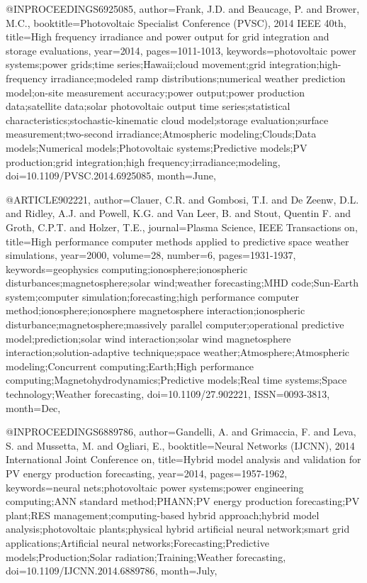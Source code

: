 @INPROCEEDINGS{6925085, 
author={Frank, J.D. and Beaucage, P. and Brower, M.C.}, 
booktitle={Photovoltaic Specialist Conference (PVSC), 2014 IEEE 40th}, 
title={High frequency irradiance and power output for grid integration and storage evaluations}, 
year={2014}, 
pages={1011-1013}, 
keywords={photovoltaic power systems;power grids;time series;Hawaii;cloud movement;grid integration;high-frequency irradiance;modeled ramp distributions;numerical weather prediction model;on-site measurement accuracy;power output;power production data;satellite data;solar photovoltaic output time series;statistical characteristics;stochastic-kinematic cloud model;storage evaluation;surface measurement;two-second irradiance;Atmospheric modeling;Clouds;Data models;Numerical models;Photovoltaic systems;Predictive models;PV production;grid integration;high frequency;irradiance;modeling},
doi={10.1109/PVSC.2014.6925085}, 
month={June},}

@ARTICLE{902221, 
author={Clauer, C.R. and Gombosi, T.I. and De Zeenw, D.L. and Ridley, A.J. and Powell, K.G. and Van Leer, B. and Stout, Quentin F. and Groth, C.P.T. and Holzer, T.E.}, 
journal={Plasma Science, IEEE Transactions on}, 
title={High performance computer methods applied to predictive space weather simulations}, 
year={2000}, 
volume={28}, 
number={6}, 
pages={1931-1937}, 
keywords={geophysics computing;ionosphere;ionospheric disturbances;magnetosphere;solar wind;weather forecasting;MHD code;Sun-Earth system;computer simulation;forecasting;high performance computer method;ionosphere;ionosphere magnetosphere interaction;ionospheric disturbance;magnetosphere;massively parallel computer;operational predictive model;prediction;solar wind interaction;solar wind magnetosphere interaction;solution-adaptive technique;space weather;Atmosphere;Atmospheric modeling;Concurrent computing;Earth;High performance computing;Magnetohydrodynamics;Predictive models;Real time systems;Space technology;Weather forecasting}, 
doi={10.1109/27.902221}, 
ISSN={0093-3813}, 
month={Dec},}

@INPROCEEDINGS{6889786, 
author={Gandelli, A. and Grimaccia, F. and Leva, S. and Mussetta, M. and Ogliari, E.}, 
booktitle={Neural Networks (IJCNN), 2014 International Joint Conference on}, 
title={Hybrid model analysis and validation for PV energy production forecasting}, 
year={2014}, 
pages={1957-1962}, 
keywords={neural nets;photovoltaic power systems;power engineering computing;ANN standard method;PHANN;PV energy production forecasting;PV plant;RES management;computing-based hybrid approach;hybrid model analysis;photovoltaic plants;physical hybrid artificial neural network;smart grid applications;Artificial neural networks;Forecasting;Predictive models;Production;Solar radiation;Training;Weather forecasting}, 
doi={10.1109/IJCNN.2014.6889786}, 
month={July},}


